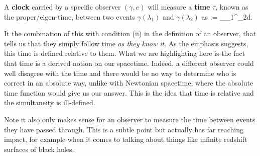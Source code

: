 \bpo 
\label{post:Clock}
    A \textbf{clock} carried by a specific observer $(\gamma,e)$ will measure a \textbf{time} $\tau$, known as the proper/eigen-time, between two events $\gamma(\lambda_1)$ and $\gamma(\lambda_2)$ as 
    \bse 
        \tau := \int_{\lambda_1}^{\lambda_2}d\lambda  {}.
    \ese 
\epo 

It the combination of this with condition (ii) in the definition of an observer, that tells us that they simply follow time \textit{as they know it}. As the emphasis suggests, this time is defined relative to them. What we are highlighting here is the fact that time is a derived notion on our spacetime. Indeed, a different observer could well disagree with the time and there would be no way to determine who is correct in an absolute way, unlike with Newtonian spacetime, where the absolute time function would give us our answer. This is the idea that time is relative and the simultaneity is ill-defined. 

\br 
\label{rem:ObserverTime}
    Note it also only makes sense for an observer to measure the time between events they have passed through. This is a subtle point but actually has far reaching impact, for example when it comes to talking about things like infinite redshift surfaces of black holes.
\er 

